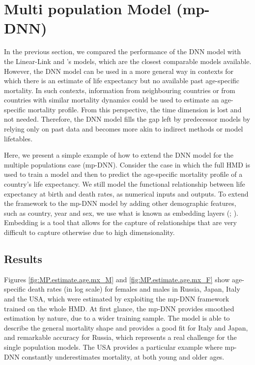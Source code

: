 \documentclass[a4,11pt]{article}
\begin{document}
\section{Multi population Model (mp-DNN)}
\label{sec:6}

In the previous section, we compared the performance of the DNN model with the Linear-Link and \citet{Sevcikova}'s models, which are the closest comparable models available. However, the DNN model can be used in a more general way in contexts for which there is an estimate of life expectancy but no available past age-specific mortality. In such contexts, information from neighbouring countries or from countries with similar mortality dynamics could be used to estimate an age-specific mortality profile. From this perspective, the time dimension is lost and not needed. Therefore, the DNN model fills the gap left by predecessor models by relying only on past data and becomes more akin to indirect methods or model lifetables. 

Here, we present a simple example of how to extend the DNN model for the multiple populations case (mp-DNN). Consider the case in which the full HMD is used to train a model and then to predict the age-specific mortality profile of a country's life expectancy. We still model the functional relationship between life expectancy at birth and death rates, as numerical inputs and outputs. To extend the framework to the mp-DNN model by adding other demographic features, such as country, year and sex, we use what is known as embedding layers (\citet{richman}; \citet{embedding}). Embedding is a tool that allows for the capture of relationships that are very difficult to capture otherwise due to high dimensionality.

\subsection*{Results}
Figures \ref{fig:MP.estimate.age.mx_M} and \ref{fig:MP.estimate.age.mx_F} show age-specific death rates (in log scale) for females and males in Russia, Japan, Italy and the USA, which were estimated by exploiting the mp-DNN framework trained on the whole HMD.
At first glance, the mp-DNN provides smoothed estimation by nature, due to a wider training sample. 
The model is able to describe the general mortality shape and provides a good fit for Italy and Japan, and remarkable accuracy for Russia, which represents a real challenge for the single population models. The USA provides a particular example where mp-DNN constantly underestimates mortality, at both young and older ages. 
\end{document}
